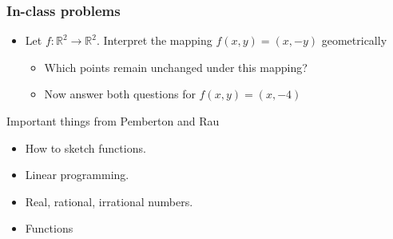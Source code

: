 \documentclass[aspectratio=169]{beamer}
\numberwithin{equation}{section}
\begin{document}
\begin{frame}
\frametitle{In-class problems}

\begin{itemize}
\item Let $f:\mathbb{R}^2\rightarrow \mathbb{R}^2$. Interpret the mapping $f(x, y)=(x, -y)$ geometrically
\begin{itemize}

\item Which points remain unchanged under this mapping? %

\item Now answer both questions for $f(x, y)=(x, -4)$ %

\end{itemize}
\end{itemize}

\end{frame}

\begin{frame}{Important things from Pemberton and Rau}

\begin{itemize}

\item How to sketch functions.
\item Linear programming.
\item Real, rational, irrational numbers.
\item \textcolor{myblack}{Functions}
\end{itemize}

\end{frame}
\end{document}
